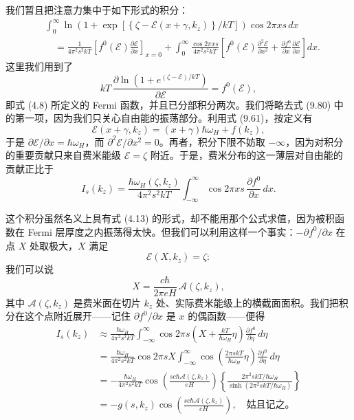 我们暂且把注意力集中于如下形式的积分：
\begin{align*}
&\int_{0}^{\infty}\ln\left(1+\exp\left[\left\{\zeta-\mathcal{E}(x+\gamma,k_{z})\right\}/kT\right]\right)\cos 2\pi xs\,dx\\
&\quad=\frac{1}{4\pi^{2}s^{2}kT}\left[f^{0}(\mathcal{E})\frac{\partial\mathcal{E}}{\partial x}\right]_{x=0}+\int_{0}^{\infty}\frac{\cos 2\pi xs}{4\pi^{2}s^{2}kT}\left[f^{0}(\mathcal{E})\frac{\partial^{2}\mathcal{E}}{\partial x^{2}}+\frac{\partial f^{0}}{\partial x}\frac{\partial\mathcal{E}}{\partial x}\right]dx.
\tag{9.80}
\end{align*}
这里我们用到了
\begin{equation*}
kT\,\frac{\partial\ln\left(1+e^{(\zeta-\mathcal{E})/kT}\right)}{\partial\mathcal{E}}=f^{0}(\mathcal{E}),
\tag{9.81}
\end{equation*}
即式 (4.8) 所定义的 Fermi 函数，并且已分部积分两次。我们将略去式 (9.80) 中的第一项，因为我们只关心自由能的振荡部分。利用式 (9.61)，按定义有
\begin{equation*}
\mathcal{E}(x+\gamma,k_{z})=(x+\gamma)\hbar\omega_{H}+f(k_{z}),
\tag{9.82}
\end{equation*}
于是 $\partial\mathcal{E}/\partial x=\hbar\omega_{H}$，而 $\partial^{2}\mathcal{E}/\partial x^{2}=0$。再者，积分下限不妨取 $-\infty$，因为对积分的重要贡献只来自费米能级 $\mathcal{E}=\zeta$ 附近。于是，费米分布的这一薄层对自由能的贡献正比于
\begin{equation*}
I_{s}(k_{z})=\frac{\hbar\omega_{H}(\zeta,k_{z})}{4\pi^{2}s^{2}kT}\int_{-\infty}^{\infty}\cos 2\pi xs\,\frac{\partial f^{0}}{\partial x}\,dx.
\tag{9.83}
\end{equation*}

这个积分虽然名义上具有式 (4.13) 的形式，却不能用那个公式求值，因为被积函数在 Fermi 层厚度之内振荡得太快。但我们可以利用这样一个事实：$-\partial f^{0}/\partial x$ 在点 $X$ 处取极大，$X$ 满足
\begin{equation*}
\mathcal{E}(X,k_{z})=\zeta:
\tag{9.84}
\end{equation*}
我们可以说
\begin{equation*}
X=\frac{c\hbar}{2\pi eH}\,\mathcal{A}(\zeta,k_{z}),
\tag{9.85}
\end{equation*}
其中 $\mathcal{A}(\zeta,k_{z})$ 是费米面在切片 $k_{z}$ 处、实际费米能级上的横截面面积。我们把积分在这个点附近展开——记住 $\partial f^{0}/\partial x$ 是 $x$ 的偶函数——便得
\begin{align*}
I_{s}(k_{z})&\approx\frac{\hbar\omega_{H}}{4\pi^{2}s^{2}kT}\int_{-\infty}^{\infty}\cos 2\pi s\left(X+\frac{kT}{\hbar\omega_{H}}\eta\right)\frac{\partial f^{0}}{\partial\eta}\,d\eta\\
&=\frac{\hbar\omega_{H}}{4\pi^{2}s^{2}kT}\cos 2\pi sX\int_{-\infty}^{\infty}\cos\left(\frac{2\pi skT}{\hbar\omega_{H}}\eta\right)\frac{\partial f^{0}}{\partial\eta}\,d\eta\\
&=-\frac{\hbar\omega_{H}}{4\pi^{2}s^{2}kT}\cos\left(\frac{sc\hbar\mathcal{A}(\zeta,k_{z})}{eH}\right)\left\{\frac{2\pi^{2}skT/\hbar\omega_{H}}{\sinh\left(2\pi^{2}skT/\hbar\omega_{H}\right)}\right\}\\
&=-g(s,k_{z})\cos\left(\frac{sc\hbar\mathcal{A}(\zeta,k_{z})}{eH}\right),\quad\text{姑且记之。}
\tag{9.86}
\end{align*}

